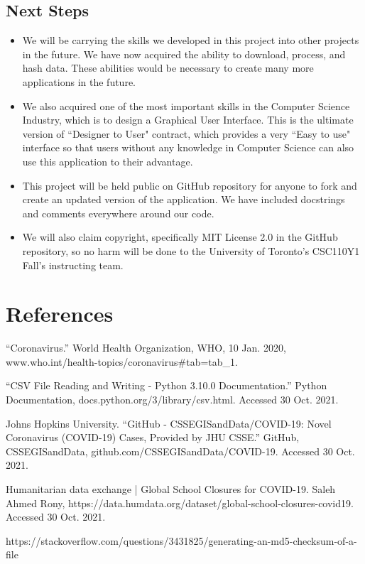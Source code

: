 \documentclass[fontsize=11pt]{article}
\begin{document}
    \subsection{Next Steps}

    \begin{itemize}
        \item We will be carrying the skills we developed in this project into other projects in the future. We have now acquired the ability to download, process, and hash data. These abilities would be necessary to create many more applications in the future.
        \item We also acquired one of the most important skills in the Computer Science Industry, which is to design a Graphical User Interface. This is the ultimate version of ``Designer to User" contract, which provides a very ``Easy to use" interface so that users without any knowledge in Computer Science can also use this application to their advantage.
        \item This project will be held public on GitHub repository for anyone to fork and create an updated version of the application. We have included docstrings and comments everywhere around our code.
        \item We will also claim copyright, specifically MIT License 2.0 in the GitHub repository, so no harm will be done to the University of Toronto's CSC110Y1 Fall's instructing team.
    \end{itemize}

    \newpage

    \section{References}

    ``Coronavirus.'' World Health Organization, WHO, 10 Jan. 2020, www.who.int/health-topics/coronavirus\#tab=tab\_1.

    ``CSV File Reading and Writing - Python 3.10.0 Documentation.'' Python Documentation, docs.python.org/3/library/csv.html. Accessed 30 Oct. 2021.

    Johns Hopkins University. ``GitHub - CSSEGISandData/COVID-19: Novel Coronavirus (COVID-19) Cases, Provided by JHU CSSE.'' GitHub, CSSEGISandData, github.com/CSSEGISandData/COVID-19. Accessed 30 Oct. 2021.

    Humanitarian data exchange | Global School Closures for COVID-19. Saleh Ahmed Rony, https://data.humdata.org/dataset/global-school-closures-covid19. Accessed 30 Oct. 2021.

    https://stackoverflow.com/questions/3431825/generating-an-md5-checksum-of-a-file
\end{document}
